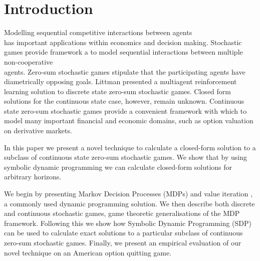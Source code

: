 \section{Introduction}

Modelling sequential competitive interactions between agents \\has 
important applications within economics and decision making. 
Stochastic games \cite{Shapley_PotNAoS_1953} provide framework 
a to model sequential interactions between multiple
non-cooperative \\agents. Zero-sum stochastic games stipulate that the
participating agents have diametrically opposing goals. 
Littman \cite{Littman_ICML_1994} presented a multiagent reinforcement
learning solution to discrete state zero-sum stochastic games. 
Closed form solutions for the continuous state case, however, 
remain unknown. Continuous state zero-sum stochastic games provide
a convenient framework with which to model many important financial
and economic domains, such as option valuation on derivative markets.

In this paper we present a novel technique to calculate a closed-form
solution to a subclass of continuous state zero-sum stochastic games. 
We show that by using symbolic dynamic programming we can calculate
closed-form solutions for arbitrary horizons.

We begin by presenting Markov Decision Processes (MDPs) and value
iteration \cite{Bellman_1957}, a commonly used dynamic programming
solution. We then describe both discrete and continuous stochastic 
games, game theoretic generalisations of the MDP framework. 
Following this we show how Symbolic Dynamic Programming (SDP) 
\cite{Boutilier_IJCAI_2001} can be used to calculate exact solutions
to a particular subclass of continuous zero-sum stochastic games. 
Finally, we present an empirical evaluation of our novel technique on 
an American option quitting game.